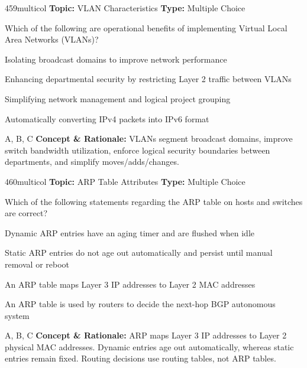 \begin{qcard}{459}{multicol}
\textcolor{darkslate!75}{\small\textbf{Topic:} VLAN Characteristics \hfill \textbf{Type:} Multiple Choice}\vspace{0.4em}\par
Which of the following are operational benefits of implementing Virtual Local Area Networks (VLANs)?
\begin{qoptions}
\item Isolating broadcast domains to improve network performance
\item Enhancing departmental security by restricting Layer 2 traffic between VLANs
\item Simplifying network management and logical project grouping
\item Automatically converting IPv4 packets into IPv6 format
\end{qoptions}
\end{qcard}
\nopagebreak
\begin{explainbox}{A, B, C}
\textbf{Concept \& Rationale:} VLANs segment broadcast domains, improve switch bandwidth utilization, enforce logical security boundaries between departments, and simplify moves/adds/changes.
\end{explainbox}

\begin{qcard}{460}{multicol}
\textcolor{darkslate!75}{\small\textbf{Topic:} ARP Table Attributes \hfill \textbf{Type:} Multiple Choice}\vspace{0.4em}\par
Which of the following statements regarding the ARP table on hosts and switches are correct?
\begin{qoptions}
\item Dynamic ARP entries have an aging timer and are flushed when idle
\item Static ARP entries do not age out automatically and persist until manual removal or reboot
\item An ARP table maps Layer 3 IP addresses to Layer 2 MAC addresses
\item An ARP table is used by routers to decide the next-hop BGP autonomous system
\end{qoptions}
\end{qcard}
\nopagebreak
\begin{explainbox}{A, B, C}
\textbf{Concept \& Rationale:} ARP maps Layer 3 IP addresses to Layer 2 physical MAC addresses. Dynamic entries age out automatically, whereas static entries remain fixed. Routing decisions use routing tables, not ARP tables.
\end{explainbox}

